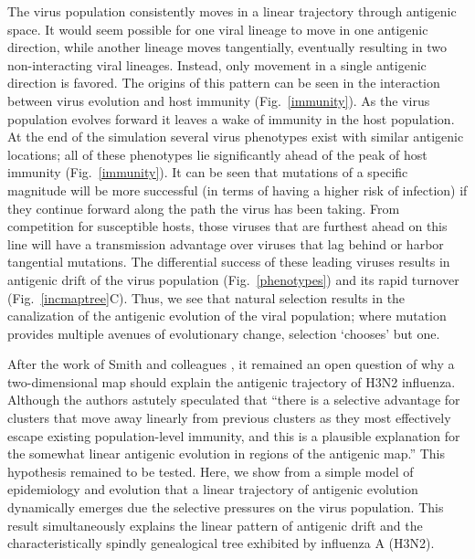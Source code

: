 \documentclass[11pt,oneside,letterpaper]{article}
\begin{document}
The virus population consistently moves in a linear trajectory through antigenic space.  It would seem possible for one viral lineage to move in one antigenic direction, while another lineage moves tangentially, eventually resulting in two non-interacting viral lineages.  Instead, only movement in a single antigenic direction is favored.  The origins of this pattern can be seen in the interaction between virus evolution and host immunity (Fig.~\ref{immunity}).  As the virus population evolves forward it leaves a wake of immunity in the host population.  At the end of the simulation several virus phenotypes exist with similar antigenic locations; all of these phenotypes lie significantly ahead of the peak of host immunity (Fig.~\ref{immunity}).  It can be seen that mutations of a specific magnitude will be more successful (in terms of having a higher risk of infection) if they continue forward along the path the virus has been taking.  From competition for susceptible hosts, those viruses that are furthest ahead on this line will have a transmission advantage over viruses that lag behind or harbor tangential mutations.  The differential success of these leading viruses results in antigenic drift of the virus population (Fig.~\ref{phenotypes}) and its rapid turnover (Fig.~\ref{incmaptree}C).  Thus, we see that natural selection results in the canalization of the antigenic evolution of the viral population; where mutation provides multiple avenues of evolutionary change, selection `chooses' but one.

After the work of Smith and colleagues \cite{Smith04}, it remained an open question of why a two-dimensional map should explain the antigenic trajectory of H3N2 influenza.  Although the authors astutely speculated that ``there is a selective advantage for clusters that move away linearly from previous clusters as they most effectively escape existing population-level immunity, and this is a plausible explanation for the somewhat linear antigenic evolution in regions of the antigenic map.''  This hypothesis remained to be tested.  Here, we show from a simple model of epidemiology and evolution that a linear trajectory of antigenic evolution dynamically emerges due the selective pressures on the virus population.  This result simultaneously explains the linear pattern of antigenic drift \cite{Smith04} and the characteristically spindly genealogical tree \cite{Fitch97} exhibited by influenza A (H3N2).
\end{document}
